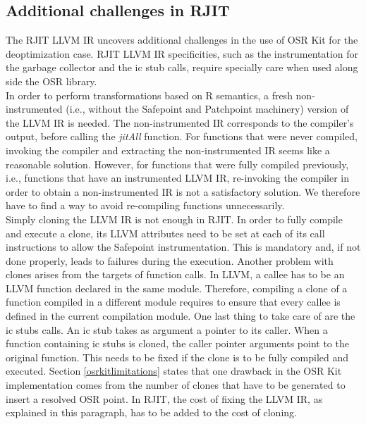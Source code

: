 \subsection{Additional challenges in RJIT}\label{additionalchallenges}

The RJIT LLVM IR uncovers additional challenges in the use of OSR Kit\cite{OSRKit} for the deoptimization case.
RJIT LLVM IR specificities, such as the instrumentation for the garbage collector and the ic stub calls, require specially care when used along side the OSR library.\\

In order to perform transformations based on R semantics, a fresh non-instrumented (i.e., without the Safepoint and Patchpoint machinery) version of the LLVM IR is needed.
The non-instrumented IR corresponds to the compiler's output, before calling the \textit{jitAll} function.
For functions that were never compiled, invoking the compiler and extracting the non-instrumented IR seems like a reasonable solution.
However, for functions that were fully compiled previously, i.e., functions that have an instrumented LLVM IR, re-invoking the compiler in order to obtain a non-instrumented IR is not a satisfactory solution.
We therefore have to find a way to avoid re-compiling functions unnecessarily.\\

Simply cloning the LLVM IR is not enough in RJIT.
In order to fully compile and execute a clone, its LLVM attributes need to be set at each of its call instructions to allow the Safepoint instrumentation.
This is mandatory and, if not done properly, leads to failures during the execution.
Another problem with clones arises from the targets of function calls.
In LLVM, a callee has to be an LLVM function declared in the same module.
Therefore, compiling a clone of a function compiled in a different module requires to ensure that every callee is defined in the current compilation module.
One last thing to take care of are the ic stubs calls.
An ic stub takes as argument a pointer to its caller.
When a function containing ic stubs is cloned, the caller pointer arguments point to the original function.
This needs to be fixed if the clone is to be fully compiled and executed.
Section \ref{osrkitlimitations} states that one drawback in the OSR Kit implementation comes from the number of clones that have to be generated to insert a resolved OSR point.
In RJIT, the cost of fixing the LLVM IR, as explained in this paragraph, has to be added to the cost of cloning.\\

